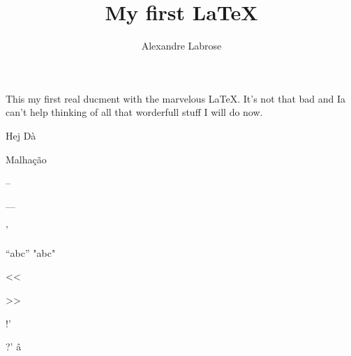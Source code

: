\documentclass{article}
\title{My f{}irst \LaTeX{}}
\author{Alexandre Labrose}
\begin{document}
\maketitle
This my first real ducment with the marvelous \LaTeX{}.
It's not that bad and Ia can't help thinking of all that worderfull stuff I will do now.


Hej Dà

Malhação

--

---

'

``abc'' "abc"

<<

>>

!'

?'
â
\end{document}
